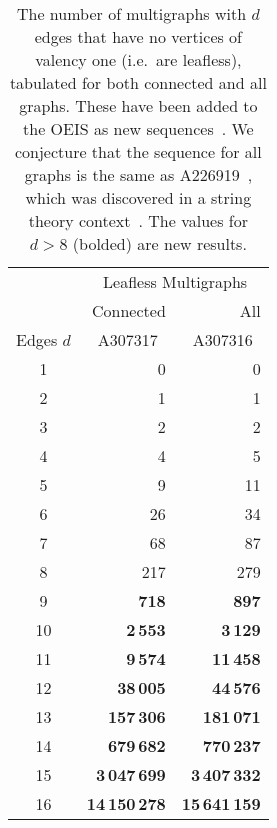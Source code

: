 \documentclass[aps,prd,floatfix,preprintnumbers,twocolumn,groupedaddress,nofootinbib,longbibliography,10pt]{revtex4-1}
\providecommand{\href}[2]{#2}
\begin{document}
\begin{table}[t]
\centering
\begin{tabular}{c @{$\quad$} r @{$\quad$} r}
\hline\hline
 & \multicolumn{2}{c}{\,Leafless Multigraphs} \\
 & Connected & All\\
Edges $d$ & \href{https://oeis.org/A307317}{A307317}~\cite{oeisA307317} & \href{https://oeis.org/A307316}{A307316}~\cite{oeisA307316} \\ \hline\hline 
1   &                 0 &                 0 \\
2   &                 1 &                 1 \\
3   &                 2 &                 2 \\
4   &                 4 &                 5 \\
5   &                 9 &                11 \\
6   &               26  &                34 \\
7   &               68  &                87 \\
8   &             217   &               279 \\
9   &             {\bf 718}   &         {\bf 897} \\
10  &        {\bf  2\,553}    &      {\bf 3\,129} \\
11  &        {\bf   9\,574}   &     {\bf 11\,458} \\
12  &       {\bf 38\,005}     &     {\bf 44\,576} \\
13  &     {\bf 157\,306}      &    {\bf 181\,071} \\
14  &    {\bf  679\,682}      &    {\bf 770\,237} \\
15  & {\bf 3\,047\,699}       & {\bf 3\,407\,332} \\
16  & {\bf 14\,150\,278} & {\bf 15\,641\,159} \\
\hline\hline
\end{tabular}
\caption{The number of multigraphs with $d$ edges that have no vertices of valency one (i.e.\ are leafless), tabulated for both connected and all graphs.
%
These have been added to the OEIS as new sequences~\cite{oeisA307317,oeisA307316}.
%
We conjecture that the sequence for all graphs is the same as \href{https://oeis.org/A226919}{A226919}~\cite{oeisA226919}, which was discovered in a string theory context~\cite{Boels:2013jua}.
%
The values for $d>8$ (bolded) are new results.}
\label{tab:sequence}
\end{table}
\end{document}
